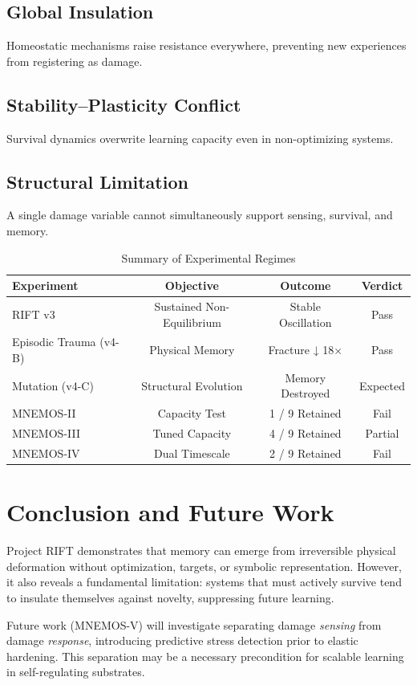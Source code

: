 \documentclass[11pt, a4paper]{article}
\begin{document}
\subsection{Global Insulation}
Homeostatic mechanisms raise resistance everywhere, preventing new experiences from registering as damage.

\subsection{Stability–Plasticity Conflict}
Survival dynamics overwrite learning capacity even in non-optimizing systems.

\subsection{Structural Limitation}
A single damage variable cannot simultaneously support sensing, survival, and memory.

\begin{table}[H]
\centering
\begin{tabular}{lccc}
\toprule
Experiment & Objective & Outcome & Verdict \\
\midrule
RIFT v3 & Sustained Non-Equilibrium & Stable Oscillation & Pass \\
Episodic Trauma (v4-B) & Physical Memory & Fracture ↓ 18× & Pass \\
Mutation (v4-C) & Structural Evolution & Memory Destroyed & Expected \\
MNEMOS-II & Capacity Test & 1 / 9 Retained & Fail \\
MNEMOS-III & Tuned Capacity & 4 / 9 Retained & Partial \\
MNEMOS-IV & Dual Timescale & 2 / 9 Retained & Fail \\
\bottomrule
\end{tabular}
\caption{Summary of Experimental Regimes}
\end{table}

\section{Conclusion and Future Work}

Project RIFT demonstrates that memory can emerge from irreversible physical deformation without optimization, targets, or symbolic representation. However, it also reveals a fundamental limitation: systems that must actively survive tend to insulate themselves against novelty, suppressing future learning.

Future work (MNEMOS-V) will investigate separating damage \textit{sensing} from damage \textit{response}, introducing predictive stress detection prior to elastic hardening. This separation may be a necessary precondition for scalable learning in self-regulating substrates.
\end{document}
